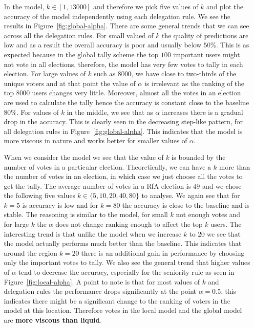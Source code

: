 In the \globalv model, $k \in [1,13000]$ and therefore we pick five values of $k$ and plot the accuracy of the model independently using each delegation rule. We see the results in Figure~\ref{fig:global-alpha}. There are some general trends that we can see across all the delegation rules. For small valued of $k$ the quality of predictions are low and as a result the overall accuracy is poor and usually below $50\%$. This is as expected because in the global tally scheme the top $100$ important users might not vote in all elections, therefore, the model has very few votes to tally in each election. For large values of $k$ such as $8000$, we have close to two-thirds of the unique voters and at that point the value of $\alpha$ is irrelevant as the ranking of the top $8000$ users changes very little. Moreover, almost all the votes in an election are used to calculate the tally hence the accuracy is constant close to the baseline $80\%$. For values of $k$ in the middle, we see that as $\alpha$ increases there is a gradual drop in the accuracy. This is clearly seen in the decreasing step-like pattern, for all delegation rules in Figure~\ref{fig:global-alpha}. This indicates that the \globalv model is more viscous in nature and works better for smaller values of $\alpha$.

When we consider the \localv model we see that the value of $k$ is bounded by the number of votes in a particular election. Theoretically, we can have a $k$ more than the number of votes in an election, in which case we just choose all the votes to get the tally. The average number of votes in a RfA election is $49$ and we chose the following five values $k \in \{5,10,20,40,80\}$ to analyse. We again see that for $k=5$ is accuracy is low and for $k=80$ the accuracy is close to the baseline and is stable. The reasoning is similar to the \globalv model, for small $k$ not enough votes and for large $k$ the $\alpha$ does not change ranking enough to affect the top $k$ users. The interesting trend is that unlike the \globalv model when we increase $k$ to $20$ we see that the \localv model actually performs much better than the baseline. This indicates that around the region $k=20$ there is an additional gain in performance by choosing only the important votes to tally. We also see the general trend that higher values of $\alpha$ tend to decrease the accuracy, especially for the seniority rule as seen in Figure~\ref{fig:local-alpha}. A point to note is that for most values of $k$ and delegation rules the performance drops significantly at the point $\alpha=0.5$, this indicates there might be a significant change to the ranking of voters in the \localv model at this location. Therefore votes in the local model and the global model are \textbf{more viscous than liquid}.

